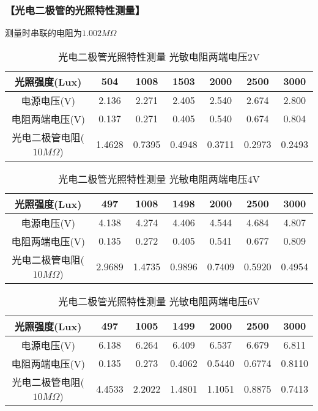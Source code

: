 \documentclass{ctexart}
\let\oldsubsubsection\subsubsection
\renewcommand{\subsubsection}[1]{\oldsubsubsection{\!\!\!\!\!\!【#1】}}
\begin{document}
\subsubsection{光电二极管的光照特性测量}

测量时串联的电阻为$1.002M\Omega$

\begin{table}[H]
  \centering
  \begin{tabular}{|c|c|c|c|c|c|c|}
    \hline
    光照强度(Lux) &504&1008&1503&2000&2500&3000\\\hline
    电源电压(V) &2.136&2.271&2.405&2.540&2.674&2.800\\\hline
    电阻两端电压(V) &0.137&0.271&0.405&0.540&0.674&0.804\\\hline
    光电二极管电阻($10M\Omega$) & 1.4628&0.7395&0.4948&0.3711&0.2973&0.2493\\\hline
  \end{tabular}
  \caption{光电二极管光照特性测量 光敏电阻两端电压2V}
\end{table}

\begin{table}[H]
  \centering
  \begin{tabular}{|c|c|c|c|c|c|c|}
    \hline
    光照强度(Lux) &497&1008&1498&2000&2500&3000\\\hline
    电源电压(V) &4.138&4.274&4.406&4.544&4.684&4.807\\\hline
    电阻两端电压(V) &0.135&0.272&0.405&0.541&0.677&0.809\\\hline
    光电二极管电阻($10M\Omega$) & 2.9689&1.4735&0.9896&0.7409&0.5920&0.4954\\\hline
  \end{tabular}
  \caption{光电二极管光照特性测量 光敏电阻两端电压4V}
\end{table}

\begin{table}[H]
  \centering
  \begin{tabular}{|c|c|c|c|c|c|c|}
    \hline
    光照强度(Lux) &497&1005&1499&2000&2500&3000\\\hline
    电源电压(V) &6.138&6.264&6.409&6.537&6.679&6.811\\\hline
    电阻两端电压(V) &0.135&0.273&0.4062&0.5440&0.6774&0.8110\\\hline
    光电二极管电阻($10M\Omega$) & 4.4533&2.2022&1.4801&1.1051&0.8875&0.7413\\\hline
  \end{tabular}
  \caption{光电二极管光照特性测量 光敏电阻两端电压6V}
\end{table}
\end{document}
